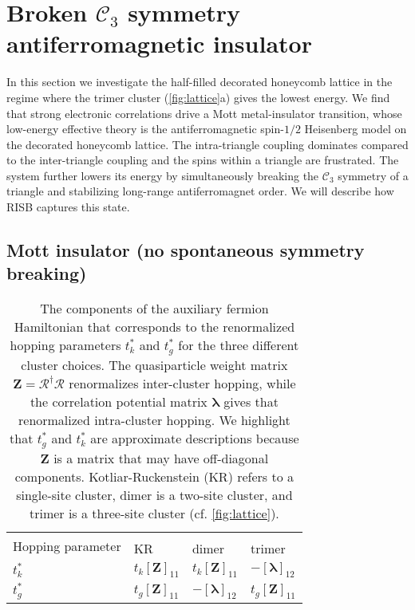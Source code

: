 \documentclass[reprint,aps,prb,amsmath,amssymb]{revtex4-2}
\begin{document}
\section{Broken $\mathcal{C}_3$ symmetry antiferromagnetic insulator}
\label{sec:three-site}

In this section we investigate the half-filled decorated honeycomb lattice in the regime where the trimer cluster (\cref{fig:lattice}a) gives the lowest energy. We find that strong electronic correlations drive a Mott metal-insulator transition, whose low-energy effective theory is the antiferromagnetic spin-$1/2$ Heisenberg model on the decorated honeycomb lattice. The intra-triangle coupling dominates compared to the inter-triangle coupling and the spins within a triangle are frustrated. The system further lowers its energy by simultaneously breaking the $\mathcal{C}_3$ symmetry of a triangle and stabilizing long-range antiferromagnet order. We will describe how RISB captures this state. 

\subsection{Mott insulator (no spontaneous symmetry breaking)}
\label{sec:three-site-mott}

\begin{table} \centering
\begin{tabular}{p{} p{} p{} p{}}
	\multirow{2}{4em}{\centering Hopping parameter} &
	\multicolumn{3}{c}{}    \\
	&
	KR &
	dimer    &
	trimer  \\
	\colrule
	$t_k^*$ \hspace{0.2cm} & $t_k [\bm{Z}]_{11}$ & $t_k [\bm{Z}]_{11}$  & $-[\bm{\lambda}]_{12}$ \\
	$t_g^*$ \hspace{0.2cm} & $t_g [\bm{Z}]_{11}$ & $-[\bm{\lambda}]_{12}$  &  $t_g [\bm{Z}]_{11}$ \\
\end{tabular}
\caption {\label{tab:real-space-para} 
	The components of the auxiliary fermion Hamiltonian that corresponds to the renormalized hopping parameters $t_k^*$ and $t_g^*$ for the three different cluster choices. The quasiparticle weight matrix $\bm{Z} = \bm{\mathcal{R}}^{\dagger} \bm{\mathcal{R}}$ renormalizes inter-cluster hopping, while the correlation potential matrix $\bm{\lambda}$ gives that renormalized intra-cluster hopping. We highlight that $t_g^*$ and $t_k^*$ are approximate descriptions because $\bm{Z}$ is a matrix that may have off-diagonal components. Kotliar-Ruckenstein (KR) refers to a single-site cluster, dimer is a two-site cluster, and trimer is a three-site cluster (cf. \cref{fig:lattice}).
}
\end{table}
\end{document}
